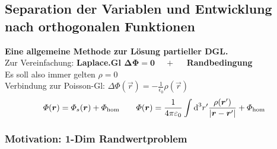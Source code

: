 \subsection{Separation der Variablen und Entwicklung nach orthogonalen Funktionen}

\textbf{Eine allgemeine Methode zur Lösung partieller DGL.}\\[5pt]
Zur Vereinfachung: \textbf{Laplace.Gl $ \boldsymbol{ \Delta \Phi = 0 \ \quad +} \quad $ Randbedingung}\\
Es soll also immer gelten $ \rho = 0 $\\[5pt]
Verbindung zur Poisson-Gl: $ \Delta \Phi(\vec{r}) = - \frac{1}{\epsilon_0} \rho(\vec{r}) $
\begin{equation*}
\varPhi(\bm{r}) = \varPhi_s(\bm{r}) + \varPhi_{\textrm{hom}} \qquad \varPhi(\bm{r}) = \frac{1}{4\pi\varepsilon_0} \int \textrm{d}^3 r' \frac{\rho(\bm{r}')}{|\bm{r} - \bm{r}'|} + \varPhi_{\textrm{hom}}
\end{equation*}

\subsubsection{Motivation: 1-Dim Randwertproblem}

